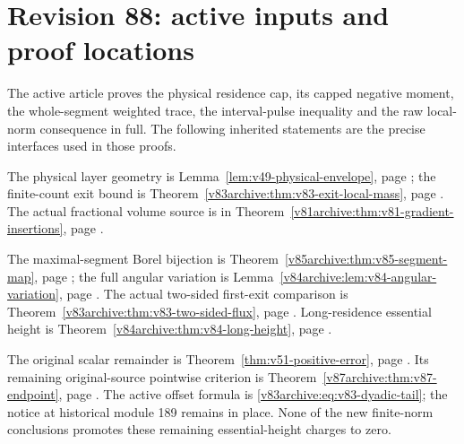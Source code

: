 \part*{Revision 88: active inputs and proof locations}
The active article proves the physical residence cap, its capped negative
moment, the whole-segment weighted trace, the interval-pulse inequality
and the raw local-norm consequence in full. The following inherited
statements are the precise interfaces used in those proofs.

The physical layer geometry is Lemma~\ref{lem:v49-physical-envelope},
page \pageref{lem:v49-physical-envelope}; the finite-count exit bound
is Theorem~\ref{v83archive:thm:v83-exit-local-mass}, page
\pageref{v83archive:thm:v83-exit-local-mass}. The actual fractional
volume source is in Theorem~\ref{v81archive:thm:v81-gradient-insertions},
page \pageref{v81archive:thm:v81-gradient-insertions}.

The maximal-segment Borel bijection is
Theorem~\ref{v85archive:thm:v85-segment-map}, page
\pageref{v85archive:thm:v85-segment-map}; the full angular variation
is Lemma~\ref{v84archive:lem:v84-angular-variation}, page
\pageref{v84archive:lem:v84-angular-variation}. The actual two-sided
first-exit comparison is Theorem~\ref{v83archive:thm:v83-two-sided-flux},
page \pageref{v83archive:thm:v83-two-sided-flux}. Long-residence
essential height is Theorem~\ref{v84archive:thm:v84-long-height},
page \pageref{v84archive:thm:v84-long-height}.

The original scalar remainder is Theorem~\ref{thm:v51-positive-error},
page \pageref{thm:v51-positive-error}. Its remaining original-source
pointwise criterion is Theorem~\ref{v87archive:thm:v87-endpoint},
page \pageref{v87archive:thm:v87-endpoint}. The active offset formula
is \eqref{v83archive:eq:v83-dyadic-tail}; the notice at historical
module 189 remains in place. None of the new finite-norm conclusions
promotes these remaining essential-height charges to zero.
